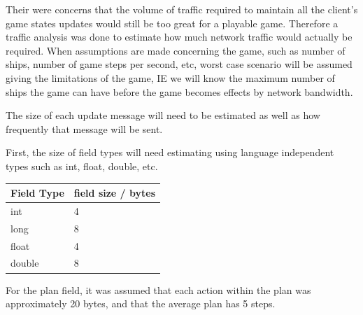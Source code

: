 Their were concerns that the volume of traffic required to maintain all the client's game states updates would still be too great for a playable game.
Therefore a traffic analysis was done to estimate how much network traffic would actually be required.
When assumptions are made concerning the game, such as number of ships, number of game steps per second, etc, worst case scenario will be assumed giving the limitations of the game, IE we will know the maximum number of ships the game can have before the game becomes effects by network bandwidth.



The size of each update message will need to be estimated as well as how frequently that message will be sent.

First, the size of field types will need estimating using language independent types such as int, float, double, etc.
\begin{center}
    \begin{tabular}{| l | l |}
    \hline
    Field Type & field size / bytes \\ \hline
    int & 4 \\ \hline
    long & 8 \\ \hline
    float & 4 \\ \hline
    double & 8 \\
    \hline
    \end{tabular}
\end{center}


For the plan field, it was assumed that each action within the plan was approximately 20 bytes, and that the average plan has 5 steps.

